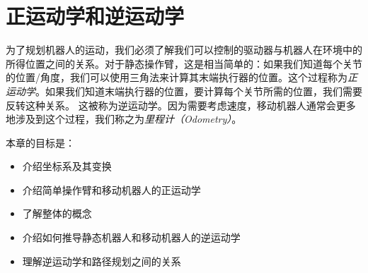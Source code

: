 \chapter{正运动学和逆运动学}
\label{chap:kinematics}


为了规划机器人的运动，我们必须了解我们可以控制的驱动器与机器人在环境中的所得位置之间的关系。对于静态操作臂，这是相当简单的：如果我们知道每个关节的位置/角度，我们可以使用三角法来计算其末端执行器的位置。这个过程称为\emph{正运动学}。如果我们知道末端执行器的位置，要计算每个关节所需的位置，我们需要反转这种关系。 这被称为逆运动学。因为需要考虑速度，移动机器人通常会更多地涉及到这个过程，我们称之为\emph{里程计（Odometry）}。

本章的目标是：


\begin{itemize}
\item 介绍坐标系及其变换
\item 介绍简单操作臂和移动机器人的正运动学
\item 了解整体的概念
\item 介绍如何推导静态机器人和移动机器人的逆运动学
\item 理解逆运动学和路径规划之间的关系
\end{itemize}

